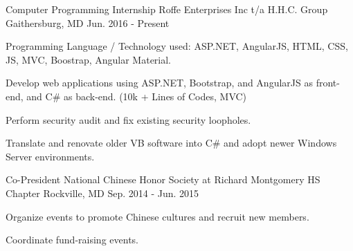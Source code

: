 

\begin{cventries}

  \cventry
    {Computer Programming Internship} %
    {Roffe Enterprises Inc t/a H.H.C. Group} %
    {Gaithersburg, MD} %
    {Jun. 2016 - Present} %
    {
      \begin{cvitems} %
       \item {Programming Language / Technology used: ASP.NET, AngularJS, HTML, CSS, JS, MVC, Boostrap, Angular Material. }
       \item {Develop web applications using ASP.NET, Bootstrap, and AngularJS as front-end, and C\# as back-end. (10k + Lines of Codes, MVC)}
       \item {Perform security audit and fix existing security loopholes.}
       \item {Translate and renovate older VB software into C\# and adopt newer Windows Server environments.}
      \end{cvitems}
    }

  \cventry
    {Co-President} %
    {National Chinese Honor Society at Richard Montgomery HS Chapter} %
    {Rockville, MD} %
    {Sep. 2014 - Jun. 2015} %
    {
      \begin{cvitems} %
        \item {Organize events to promote Chinese cultures and recruit new members.}
        \item {Coordinate fund-raising events.}
      \end{cvitems}
    }
  

\end{cventries}
